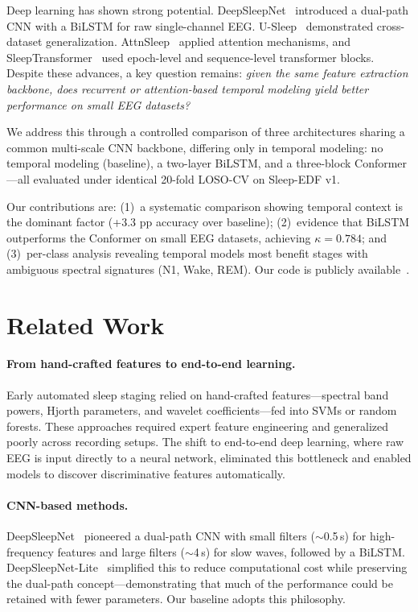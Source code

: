 \documentclass[final]{article}
\begin{document}
Deep learning has shown strong potential. DeepSleepNet~\cite{Supratak2017} introduced a dual-path CNN with a BiLSTM for raw single-channel EEG. U-Sleep~\cite{Perslev2021} demonstrated cross-dataset generalization. AttnSleep~\cite{Eldele2021} applied attention mechanisms, and SleepTransformer~\cite{Phan2022} used epoch-level and sequence-level transformer blocks. Despite these advances, a key question remains: \emph{given the same feature extraction backbone, does recurrent or attention-based temporal modeling yield better performance on small EEG datasets?}

We address this through a controlled comparison of three architectures sharing a common multi-scale CNN backbone, differing only in temporal modeling: no temporal modeling (baseline), a two-layer BiLSTM, and a three-block Conformer---all evaluated under identical 20-fold LOSO-CV on Sleep-EDF v1.

Our contributions are: (1)~a systematic comparison showing temporal context is the dominant factor (+3.3 pp accuracy over baseline); (2)~evidence that BiLSTM outperforms the Conformer on small EEG datasets, achieving $\kappa = 0.784$; and (3)~per-class analysis revealing temporal models most benefit stages with ambiguous spectral signatures (N1, Wake, REM). Our code is publicly available~\cite{SleepStageNetRepo}.

\section{Related Work}

\paragraph{From hand-crafted features to end-to-end learning.}
Early automated sleep staging relied on hand-crafted features---spectral band powers, Hjorth parameters, and wavelet coefficients---fed into SVMs or random forests. These approaches required expert feature engineering and generalized poorly across recording setups. The shift to end-to-end deep learning, where raw EEG is input directly to a neural network, eliminated this bottleneck and enabled models to discover discriminative features automatically.

\paragraph{CNN-based methods.}
DeepSleepNet~\cite{Supratak2017} pioneered a dual-path CNN with small filters ($\sim$0.5\,s) for high-frequency features and large filters ($\sim$4\,s) for slow waves, followed by a BiLSTM. DeepSleepNet-Lite~\cite{Fiorillo2019} simplified this to reduce computational cost while preserving the dual-path concept---demonstrating that much of the performance could be retained with fewer parameters. Our baseline adopts this philosophy.
\end{document}
